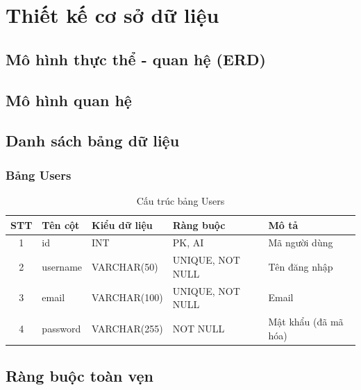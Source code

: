 
\chapter{Thiết kế cơ sở dữ liệu}
\label{chap:thiet_ke_csdl}

\section{Mô hình thực thể - quan hệ (ERD)}
\label{sec:erd}



\section{Mô hình quan hệ}
\label{sec:mo_hinh_quan_he}



\section{Danh sách bảng dữ liệu}
\label{sec:danh_sach_bang}


\subsection{Bảng Users}
\label{subsec:bang_users}

\begin{table}[H]
    \centering
    \renewcommand{\arraystretch}{1.3}
    \begin{tabularx}{\textwidth}{|c|l|l|l|X|}
        \hline
        \rowcolor{navyblue!15}
        \textbf{STT} & \textbf{Tên cột} & \textbf{Kiểu dữ liệu} & \textbf{Ràng buộc} & \textbf{Mô tả} \\
        \hline
        1 & id & INT & PK, AI & Mã người dùng \\
        \hline
        2 & username & VARCHAR(50) & UNIQUE, NOT NULL & Tên đăng nhập \\
        \hline
        3 & email & VARCHAR(100) & UNIQUE, NOT NULL & Email \\
        \hline
        4 & password & VARCHAR(255) & NOT NULL & Mật khẩu (đã mã hóa) \\
        \hline
    \end{tabularx}
    \caption{Cấu trúc bảng Users}
    \label{tab:users}
\end{table}



\section{Ràng buộc toàn vẹn}
\label{sec:rang_buoc}


